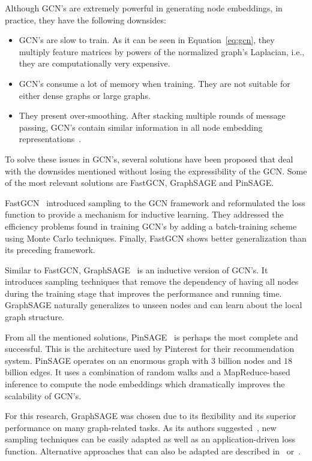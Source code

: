 Although GCN's are extremely powerful in generating node embeddings, in practice, they have the following downsides:
\begin{itemize}
    \item GCN's are slow to train. As it can be seen in Equation~\ref{eq:gcn}, they multiply feature matrices by powers of the normalized graph's Laplacian, i.e., they are computationally very expensive.
    \item GCN's consume a lot of memory when training. They are not suitable for either dense graphs or large graphs.
    \item They present over-smoothing. After stacking multiple rounds of message passing, GCN's contain similar information in all node embedding representations~\cite{hamilton}.
\end{itemize}

To solve these issues in GCN's, several solutions have been proposed that deal with the downsides mentioned without losing the expressibility of the GCN. Some of the most relevant solutions are FastGCN, GraphSAGE and PinSAGE.

FastGCN~\cite{fastgcn} introduced sampling to the GCN framework and reformulated the loss function to provide a mechanism for inductive learning. They addressed the efficiency problems found in training GCN's by adding a batch-training scheme using Monte Carlo techniques. Finally, FastGCN shows better generalization than its preceding framework. 

Similar to FastGCN, GraphSAGE~\cite{graphsage} is an inductive version of GCN's. It introduces sampling techniques that remove the dependency of having all nodes during the training stage that improves the performance and running time. GraphSAGE naturally generalizes to unseen nodes and can learn about the local graph structure.

From all the mentioned solutions, PinSAGE~\cite{pinsage} is perhaps the most complete and successful. This is the architecture used by Pinterest for their recommendation system. PinSAGE operates on an enormous graph with $3$ billion nodes and $18$ billion edges. It uses a combination of random walks and a MapReduce-based inference to compute the node embeddings which dramatically improves the scalability of GCN's.

For this research, GraphSAGE was chosen due to its flexibility and its superior performance on many graph-related tasks. As its authors suggested~\cite{graphsage}, new sampling techniques can be easily adapted as well as an application-driven loss function. Alternative approaches that can also be adapted are described in~\cite{gnnsurvey} or~\cite{hamilton}.

